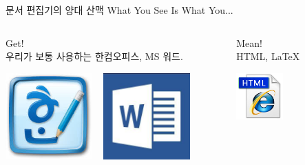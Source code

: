 \documentclass[12pt]{beamer}
\begin{document}
\begin{frame}{문서 편집기의 양대 산맥}
	What You See Is What You...
	\vfill
	\begin{columns}
		\begin{column}{0.5\textwidth}
			Get! \\
			\vfill
			우리가 보통 사용하는 한컴오피스, MS 워드. \\
			\begin{center}
				\includegraphics[width=0.4\textwidth]{hanwordicon.jpg}
				~
				\includegraphics[width=0.4\textwidth]{mswordicon.jpg}
			\end{center}
			
		\end{column}
		\begin{column}{0.5\textwidth}
			Mean! \\
			\vfill
			HTML, \LaTeX \\
			\begin{center}
				\includegraphics[width=0.4\textwidth]{htmlicon.png}
			\end{center}
		\end{column}
	\end{columns}
\end{frame}
\end{document}
